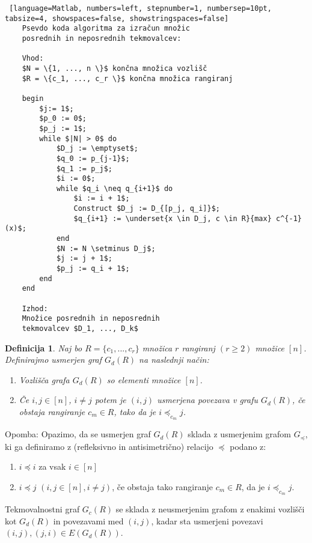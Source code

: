 \documentclass[a4paper, 12pt]{book}
\newtheorem{definicija}{Definicija}[chapter]
\begin{document}
\begin{minipage}{\linewidth}    
\begin{lstlisting} [language=Matlab, numbers=left, stepnumber=1, numbersep=10pt, tabsize=4, showspaces=false, showstringspaces=false]
    Psevdo koda algoritma za izračun množic 
    posrednih in neposrednih tekmovalcev:

    Vhod:
    $N = \{1, ..., n \}$ končna množica vozlišč
    $R = \{c_1, ..., c_r \}$ končna množica rangiranj
    
    begin
        $j:= 1$;
        $p_0 := 0$;
        $p_j := 1$;
        while $|N| > 0$ do
            $D_j := \emptyset$;
            $q_0 := p_{j-1}$;
            $q_1 := p_j$;
            $i := 0$;
            while $q_i \neq q_{i+1}$ do
                $i := i + 1$;
                Construct $D_j := D_{[p_j, q_i]}$;
                $q_{i+1} := \underset{x \in D_j, c \in R}{max} c^{-1}(x)$;
            end
            $N := N \setminus D_j$;
            $j := j + 1$;
            $p_j := q_i + 1$;
        end
    end
    
    Izhod: 
    Množice posrednih in neposrednih 
    tekmovalcev $D_1, ..., D_k$
\end{lstlisting}
\end{minipage}

\begin{definicija}
    Naj bo $R = \{ c_1, ..., c_r \}$ množica $r$ rangiranj $(r \geq 2)$ množice $[n]$. Definirajmo usmerjen graf $G_d(R)$  na naslednji način:
    \begin{enumerate}[label=(\roman*)]
        \item Vozlišča grafa $G_d(R)$ so elementi množice $[n]$.
        \item Če $i, j \in [n]$, $i \neq j$ potem je $(i, j)$ usmerjena povezava v grafu $G_d(R)$, če obstaja rangiranje $c_m \in R$, tako da je $i \preceq_{c_m} j$.
    \end{enumerate}
\end{definicija}

Opomba: Opazimo, da se usmerjen graf $G_d(R)$ sklada z usmerjenim grafom $G_{\preceq}$, ki ga definiramo z (refleksivno in antisimetrično) relacijo $\preceq$ podano z:
\begin{enumerate}[label=(\roman*)]
    \item $i \preceq i$ za vsak $i \in [n]$
    \item $i \preceq j$ $(i,j \in [n], i \neq j)$, če obstaja tako rangiranje $c_m \in R$, da je $i \preceq_{c_m} j$.
\end{enumerate}
Tekmovalnostni graf $G_c(R)$ se sklada z neusmerjenim grafom z enakimi vozlišči kot $G_d(R)$ in povezavami med $(i, j)$, kadar sta usmerjeni povezavi $(i, j), (j, i) \in E(G_d(R))$.
\end{document}
